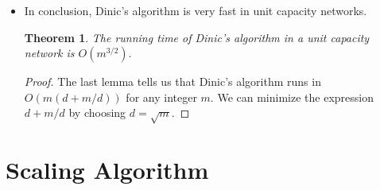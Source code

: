 \documentclass[10pt]{article}
\newtheorem{theorem}[lemma]{Theorem}
\begin{document}
\begin{itemize}
      \item In conclusion, Dinic's algorithm is very fast
        in unit capacity networks.
        
        \begin{theorem}
          The running time of Dinic's algorithm in a unit capacity
          network is $O(m^{3/2}).$
        \end{theorem}
        
        \begin{proof}
          The last lemma tells us that Dinic's algorithm runs
          in $O(m(d + m/d))$ for any integer $m$. We can minimize
          the expression $d + m/d$ by choosing $d = \sqrt m$.
        \end{proof}
    \end{itemize}
    
  \section{Scaling Algorithm} %
  \label{sec:scaling_algorithm}
\end{document}
